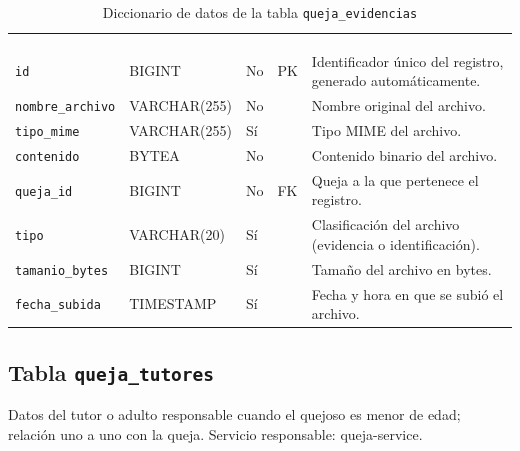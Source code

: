 \footnotesize
\renewcommand{\arraystretch}{1.15}
\setlength{\tabcolsep}{4pt}
\begin{longtable}{|L{3.9cm}|L{2.4cm}|L{0.9cm}|L{1.2cm}|L{6.6cm}|}
	\hiderowcolors\caption{Diccionario de datos de la tabla \texttt{queja\_evidencias}}
	\label{tab:dic_queja_evidencias} \\ \showrowcolors
	\hline
	 &  &  &  &  \\
	\hline
	\endfirsthead
	\hline
	 &  &  &  &  \\
	\hline
	\endhead
		\texttt{id} & BIGINT & No & PK & Identificador único del registro, generado automáticamente. \\ \hline
		\texttt{nombre\_\allowbreak{}archivo} & VARCHAR(255) & No &  & Nombre original del archivo. \\ \hline
		\texttt{tipo\_\allowbreak{}mime} & VARCHAR(255) & Sí &  & Tipo MIME del archivo. \\ \hline
		\texttt{contenido} & BYTEA & No &  & Contenido binario del archivo. \\ \hline
		\texttt{queja\_\allowbreak{}id} & BIGINT & No & FK & Queja a la que pertenece el registro. \\ \hline
		\texttt{tipo} & VARCHAR(20) & Sí &  & Clasificación del archivo (evidencia o identificación). \\ \hline
		\texttt{tamanio\_\allowbreak{}bytes} & BIGINT & Sí &  & Tamaño del archivo en bytes. \\ \hline
		\texttt{fecha\_\allowbreak{}subida} & TIMESTAMP & Sí &  & Fecha y hora en que se subió el archivo. \\ \hline
\end{longtable}
\normalsize
\setlength{\tabcolsep}{6pt}
\renewcommand{\arraystretch}{1}

\subsection{Tabla \texttt{queja\_tutores}}
Datos del tutor o adulto responsable cuando el quejoso es menor de edad; relación uno a uno con la queja. Servicio responsable: queja-service.


